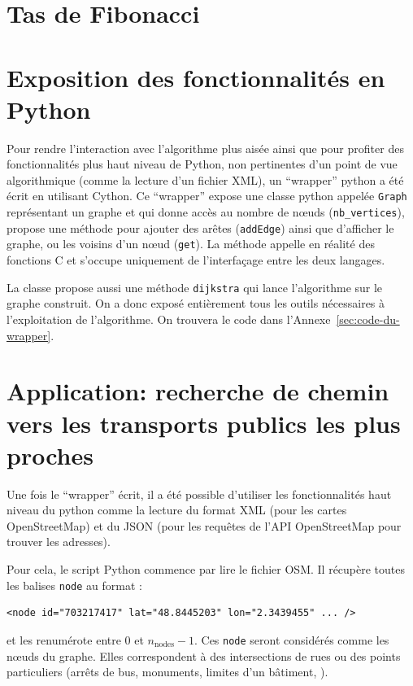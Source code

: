 \documentclass{article}
\begin{document}
\section{Tas de Fibonacci}\label{sec:tas-de-fibonacci}
\section{Exposition des fonctionnalités en
  Python}\label{sec:expos-des-fonct}
Pour rendre l'interaction avec l'algorithme plus aisée ainsi que pour
profiter des fonctionnalités plus haut niveau de Python, non
pertinentes d'un point de vue algorithmique (comme la lecture d'un
fichier XML), un ``wrapper'' python a été écrit en utilisant
Cython. Ce ``wrapper'' expose une classe python appelée \verb|Graph|
représentant un graphe et qui donne accès au nombre de nœuds
(\verb|nb_vertices|), propose une méthode pour ajouter des arêtes
(\verb|addEdge|) ainsi que d'afficher le graphe, ou les voisins d'un
nœud (\verb|get|). La méthode appelle en réalité des fonctions C et
s'occupe uniquement de l'interfaçage entre les deux langages.

La classe propose aussi une méthode \verb|dijkstra| qui lance
l'algorithme sur le graphe construit. On a donc exposé entièrement
tous les outils nécessaires à l'exploitation de l'algorithme. On
trouvera le code dans l'Annexe~\ref{sec:code-du-wrapper}.
\section{Application: recherche de chemin vers les transports publics
  les plus proches}\label{sec:appl-rech-de}
Une fois le ``wrapper'' écrit, il a été possible d'utiliser les
fonctionnalités haut niveau du python comme la lecture du format XML
(pour les cartes OpenStreetMap) et du JSON (pour les requêtes de l'API
OpenStreetMap pour trouver les adresses).

Pour cela, le script Python commence par lire le fichier OSM. Il
récupère toutes les balises \verb|node| au format :
\begin{verbatim}
<node id="703217417" lat="48.8445203" lon="2.3439455" ... />
\end{verbatim}
et les renumérote entre $0$ et $n_\mathrm{nodes}-1$. Ces \verb|node|
seront considérés comme les nœuds du graphe. Elles correspondent à des
intersections de rues ou des points particuliers (arrêts de bus,
monuments, limites d'un bâtiment, ).
\end{document}
